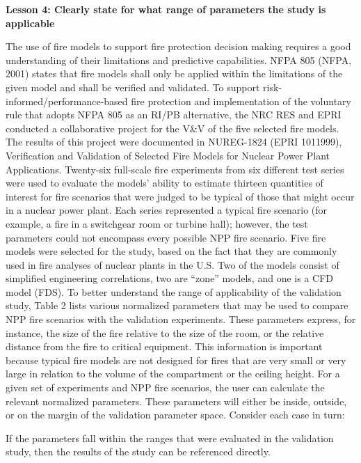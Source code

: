 \documentclass[fleqn,b5paper]{article}
\begin{document}
\vspace{\parskip}
{\bf Lesson 4: Clearly state for what range of parameters the study is applicable}

The use of fire models to support fire protection decision making requires a good understanding of their limitations and predictive capabilities. NFPA 805 (NFPA, 2001) states that fire models shall only be applied within the limitations of the given model and shall be verified and validated. To support risk-informed/performance-based fire protection and implementation of the voluntary rule that adopts NFPA 805 as an RI/PB alternative, the NRC RES and EPRI conducted a collaborative project for the V\&V of the five selected fire models. The results of this project were documented in NUREG-1824 (EPRI 1011999), Verification and Validation of Selected Fire Models for Nuclear Power Plant Applications.
Twenty-six full-scale fire experiments from six different test series were used to evaluate the models' ability to estimate thirteen quantities of interest for fire scenarios that were judged to be typical of those that might occur in a nuclear power plant. Each series represented a typical fire scenario (for example, a fire in a switchgear room or turbine hall); however, the test parameters could not encompass every possible NPP fire scenario. Five fire models were selected for the study, based on the fact that they are commonly used in fire analyses of nuclear plants in the U.S. Two of the models consist of simplified engineering correlations, two are ``zone'' models, and one is a CFD model (FDS).
To better understand the range of applicability of the validation study, Table 2 lists various normalized parameters that may be used to compare NPP fire scenarios with the validation experiments. These parameters express, for instance, the size of the fire relative to the size of the room, or the relative distance from the fire to critical equipment. This information is important because typical fire models are not designed for fires that are very small or very large in relation to the volume of the compartment or the ceiling height. For a given set of experiments and NPP fire scenarios, the user can calculate the relevant normalized parameters. These parameters will either be inside, outside, or on the margin of the validation parameter space. Consider each case in turn:

If the parameters fall within the ranges that were evaluated in the validation study, then the results of the study can be referenced directly.
\end{document}
